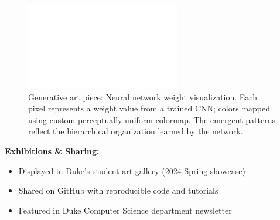 \begin{figure}[h]
\centering
\includegraphics[width=0.6\textwidth]{assets/placeholder_1600x900.png}
\caption{Generative art piece: Neural network weight visualization. Each pixel represents a weight value from a trained CNN; colors mapped using custom perceptually-uniform colormap. The emergent patterns reflect the hierarchical organization learned by the network.}
\end{figure}

\vspace{1em}

\textbf{Exhibitions \& Sharing:}
\begin{itemize}[leftmargin=1.2em, itemsep=0.1em]
  \item Displayed in Duke's student art gallery (2024 Spring showcase)
  \item Shared on GitHub with reproducible code and tutorials
  \item Featured in Duke Computer Science department newsletter
\end{itemize}

